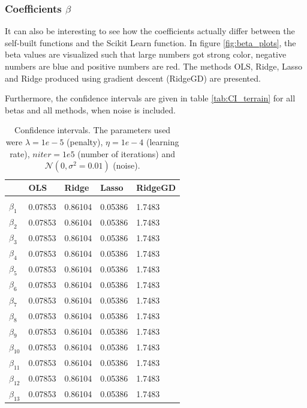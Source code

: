\subsubsection{Coefficients $\beta$}
It can also be interesting to see how the coefficients actually differ between the self-built functions and the Scikit Learn function. In figure \eqref{fig:beta_plots}, the beta values are visualized such that large numbers got strong color, negative numbers are blue and positive numbers are red. The methods OLS, Ridge, Lasso and Ridge produced using gradient descent (RidgeGD) are presented. 

Furthermore, the confidence intervals are given in table \eqref{tab:CI_terrain} for all betas and all methods, when noise is included.

\begin{table} [H]
	\caption{Confidence intervals. The parameters used were $\lambda=1e-5$ (penalty), $\eta=1e-4$ (learning rate), $niter=1e5$ (number of iterations) and $\mathcal{N}(0, \sigma^2=0.01)$ (noise).  \vspace{2mm}}
	\begin{tabularx}{\textwidth}{l|XXXX} \hline\hline
		\label{tab:CI_terrain}
		&\textbf{OLS}&\textbf{Ridge}&\textbf{Lasso}&\textbf{RidgeGD}\\ \hline \\
		$\beta_1$ & 0.07853 & 0.86104 & 0.05386 & 1.7483\\
		$\beta_2$ & 0.07853 & 0.86104 & 0.05386 & 1.7483\\
		$\beta_3$ & 0.07853 & 0.86104 & 0.05386 & 1.7483\\
		$\beta_4$ & 0.07853 & 0.86104 & 0.05386 & 1.7483\\
		$\beta_5$ & 0.07853 & 0.86104 & 0.05386 & 1.7483\\
		$\beta_6$ & 0.07853 & 0.86104 & 0.05386 & 1.7483\\
		$\beta_7$ & 0.07853 & 0.86104 & 0.05386 & 1.7483\\
		$\beta_8$ & 0.07853 & 0.86104 & 0.05386 & 1.7483\\
		$\beta_9$ & 0.07853 & 0.86104 & 0.05386 & 1.7483\\
		$\beta_{10}$ & 0.07853 & 0.86104 & 0.05386 & 1.7483\\
		$\beta_{11}$ & 0.07853 & 0.86104 & 0.05386 & 1.7483\\
		$\beta_{12}$ & 0.07853 & 0.86104 & 0.05386 & 1.7483\\
		$\beta_{13}$ & 0.07853 & 0.86104 & 0.05386 & 1.7483\\

\end{tabularx}
\end{table}
